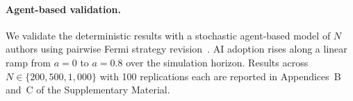 \documentclass{article}
\begin{document}
\paragraph{Agent-based validation.}
We validate the deterministic results with a stochastic agent-based model of $N$ authors using pairwise Fermi strategy revision~\citep{Szabo1998, Traulsen2009}.
AI adoption rises along a linear ramp from $a = 0$ to $a = 0.8$ over the simulation horizon.
Results across $N \in \{200, 500, 1{,}000\}$ with 100 replications each are reported in Appendices~B and~C of the Supplementary Material.

\clearpage



\end{document}
